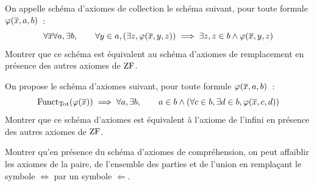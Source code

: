 \begin{exercise}
  On appelle schéma d'axiomes de collection le schéma suivant, pour toute
  formule $\varphi(\overline{x},a,b)$~:
  \[\forall \overline{x} \forall a,\exists b,\qquad
  \forall y\in a,(\exists z, \varphi(\overline{x},y,z))
  \implies \exists z, z \in b \land \varphi(\overline{x}, y,z)\]
  Montrer que ce schéma est équivalent au schéma d'axiomes de remplacement en
  présence des autres axiomes de $\operatorname{ZF}$.
\end{exercise}

\begin{exercise}
  On propose le schéma d'axiomes suivant, pour toute formule
  $\varphi(\overline{x},a,b)$~:
  \[\operatorname{Funct}_{\operatorname{Tot}}(\varphi(\overline{x})) \implies \forall a, \exists b,\qquad
  a\in b \land (\forall c \in b,\exists d \in b, \varphi(\overline{x},c,d))\]
  Montrer que ce schéma d'axiomes est équivalent à l'axiome de l'infini en
  présence des autres axiomes de $\operatorname{ZF}$.
\end{exercise}

\begin{exercise}
  Montrer qu'en présence du schéma d'axiomes de compréhension, on peut affaiblir
  les axiomes de la paire, de l'ensemble des parties et de l'union en remplaçant
  le symbole $\iff$ par un symbole $\Leftarrow$.
\end{exercise}



